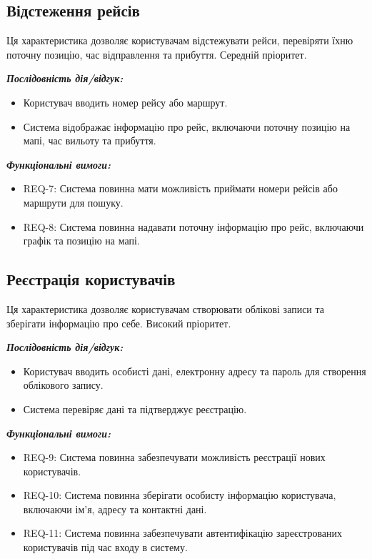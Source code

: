 \documentclass[14pt]{extreport}
\begin{document}
\begin{normalsize}
	\subsection*{Відстеження рейсів} 
	Ця характеристика дозволяє користувачам відстежувати рейси, перевіряти їхню поточну позицію, час відправлення та прибуття. Середній пріоритет.
	
	\textbf{\textit{Послідовність дія/відгук:}}
	\begin{itemize}
		\item Користувач вводить номер рейсу або маршрут.
		\item Система відображає інформацію про рейс, включаючи поточну позицію на мапі, час вильоту та прибуття.
	\end{itemize}
	
	\textbf{\textit{Функціональні вимоги:}}
	\begin{itemize}
		\item REQ-7: Система повинна мати можливість приймати номери рейсів або маршрути для пошуку.
		\item REQ-8: Система повинна надавати поточну інформацію про рейс, включаючи графік та позицію на мапі.
	\end{itemize}

	\subsection*{Реєстрація користувачів} 
	Ця характеристика дозволяє користувачам створювати облікові записи та зберігати інформацію про себе. Високий пріоритет.
	
	\textbf{\textit{Послідовність дія/відгук:}}
	\begin{itemize}
		\item Користувач вводить особисті дані, електронну адресу та пароль для створення облікового запису.
		\item Система перевіряє дані та підтверджує реєстрацію.
	\end{itemize}
	
	\textbf{\textit{Функціональні вимоги:}}
	\begin{itemize}
		\item REQ-9: Система повинна забезпечувати можливість реєстрації нових користувачів.
		\item REQ-10: Система повинна зберігати особисту інформацію користувача, включаючи ім'я, адресу та контактні дані.
		\item REQ-11: Система повинна забезпечувати автентифікацію зареєстрованих користувачів під час входу в систему.
	\end{itemize}
	

\end{normalsize}
\end{document}
